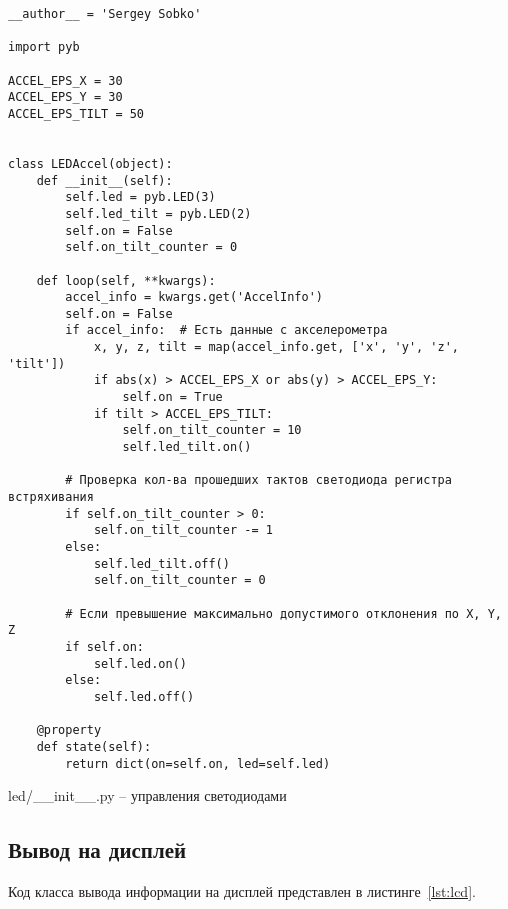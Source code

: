 \documentclass[document.tex]{subfiles}
\begin{document}
\begin{listing}[ht]
\begin{verbatim}
__author__ = 'Sergey Sobko'

import pyb

ACCEL_EPS_X = 30
ACCEL_EPS_Y = 30
ACCEL_EPS_TILT = 50


class LEDAccel(object):
    def __init__(self):
        self.led = pyb.LED(3)
        self.led_tilt = pyb.LED(2)
        self.on = False
        self.on_tilt_counter = 0

    def loop(self, **kwargs):
        accel_info = kwargs.get('AccelInfo')
        self.on = False
        if accel_info:  # Есть данные с акселерометра
            x, y, z, tilt = map(accel_info.get, ['x', 'y', 'z', 'tilt'])
            if abs(x) > ACCEL_EPS_X or abs(y) > ACCEL_EPS_Y:
                self.on = True
            if tilt > ACCEL_EPS_TILT:
                self.on_tilt_counter = 10
                self.led_tilt.on()

        # Проверка кол-ва прошедших тактов светодиода регистра встряхивания
        if self.on_tilt_counter > 0:
            self.on_tilt_counter -= 1
        else:
            self.led_tilt.off()
            self.on_tilt_counter = 0

        # Если превышение максимально допустимого отклонения по X, Y, Z
        if self.on:
            self.led.on()
        else:
            self.led.off()

    @property
    def state(self):
        return dict(on=self.on, led=self.led)
\end{verbatim}
\caption{led/\_\_init\_\_.py -- управления светодиодами}
\label{lst:led}
\end{listing}


\clearpage
\subsection{Вывод на дисплей}
Код класса вывода информации на дисплей представлен в листинге~\ref{lst:lcd}.
\end{document}
